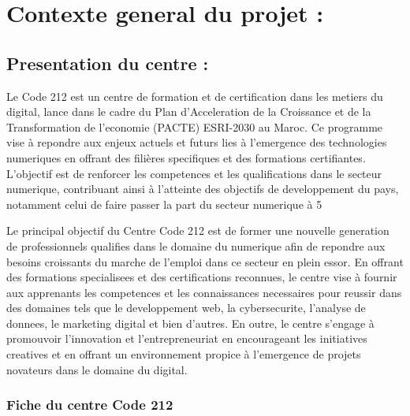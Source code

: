 \chapter{Contexte general du projet :}
\section{Presentation du centre :}
Le Code 212 est un centre de formation et de certification dans les metiers du digital, lance dans le cadre du Plan d'Acceleration de la Croissance et de la Transformation de l'economie (PACTE) ESRI-2030 au Maroc. Ce programme vise à repondre aux enjeux actuels et futurs lies à l'emergence des technologies numeriques en offrant des filières specifiques et des formations certifiantes. L'objectif est de renforcer les competences et les qualifications dans le secteur numerique, contribuant ainsi à l'atteinte des objectifs de developpement du pays, notamment celui de faire passer la part du secteur numerique à 5%

Le principal objectif du Centre Code 212 est de former une nouvelle generation de professionnels qualifies dans le domaine du numerique afin de repondre aux besoins croissants du marche de l'emploi dans ce secteur en plein essor. En offrant des formations specialisees et des certifications reconnues, le centre vise à fournir aux apprenants les competences et les connaissances necessaires pour reussir dans des domaines tels que le developpement web, la cybersecurite, l'analyse de donnees, le marketing digital et bien d'autres. En outre, le centre s'engage à promouvoir l'innovation et l'entrepreneuriat en encourageant les initiatives creatives et en offrant un environnement propice à l'emergence de projets novateurs dans le domaine du digital.

\subsection{Fiche du centre Code 212}

